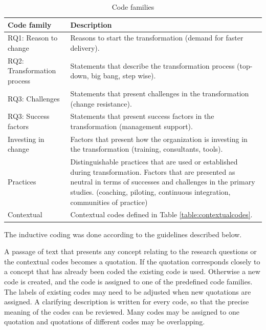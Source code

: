 \documentclass[preprint,authoryear,12pt]{elsarticle}
\begin{document}
\begin{table}[t]
    \centering
    \begin{tabular}{ >{\raggedright\arraybackslash}p{}
                     >{\raggedright\arraybackslash}p{} }
        \toprule
        Code family          &  Description
        \\
        \midrule

        RQ1: Reason to change &
        Reasons to start the transformation (demand for faster delivery). \\

		RQ2: Transformation process &
		Statements that describe the transformation process (top-down, big bang,
		step wise). \\

		RQ3: Challenges &
		Statements that present challenges in the transformation (change resistance).
		\\

		RQ3: Success factors &
		Statements that present success factors in the transformation (management
		support).
		\\

		Investing in change  &
		Factors that present how the organization is investing in the
		transformation (training, consultants, tools). \\

		Practices &
		Distinguishable practices that are used or established during transformation.
		Factors that are presented as neutral in terms of successes and challenges
		in the primary studies.
		(coaching, piloting, continuous integration, communities of practice) \\
		
		Contextual &
		Contextual codes defined in Table \ref{table:contextualcodes}. \\
		
        \bottomrule
    \end{tabular}
    \caption{Code families}
    \label{table:codefamilies}
\end{table}

The inductive coding was done according to the guidelines described below.

A passage of text that presents any concept relating to the research questions
or the contextual codes becomes a quotation. If the quotation corresponds
closely to a concept that has already been coded the existing code is used.
Otherwise a new code is created, and the code is assigned to one of the
predefined code families. The labels of existing codes may need to be adjusted
when new quotations are assigned. A clarifying description is written for every
code, so that the precise meaning of the codes can be reviewed. Many codes may
be assigned to one quotation and quotations of different codes may be
overlapping.
\end{document}

